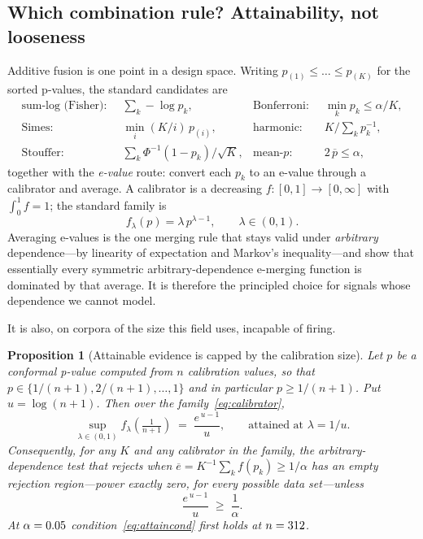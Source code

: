 \documentclass[preprint,12pt,authoryear]{elsarticle}
\newtheorem{proposition}[theorem]{Proposition}
\theoremstyle{definition}
\begin{document}
\subsection{Which combination rule? Attainability, not looseness}
\label{sec:attainability}

Additive fusion is one point in a design space. Writing $p_{(1)} \le \dots \le
p_{(K)}$ for the sorted p-values, the standard candidates are
\begin{align*}
\text{sum-log (Fisher)}:&\;\; \textstyle\sum_k -\log p_k,
&\text{Bonferroni}:&\;\; \min_k p_k \le \alpha/K, \\
\text{Simes}:&\;\; \min_i (K/i)\, p_{(i)},
&\text{harmonic}:&\;\; K / \textstyle\sum_k p_k^{-1}, \\
\text{Stouffer}:&\;\; \textstyle\sum_k \Phi^{-1}(1 - p_k)/\sqrt{K},
&\text{mean-}p:&\;\; 2\,\overline{p} \le \alpha,
\end{align*}
together with the \emph{e-value} route: convert each $p_k$ to an e-value through a
calibrator and average. A calibrator is a decreasing $f:[0,1] \to [0,\infty]$ with
$\int_0^1 f = 1$; the standard family is
\begin{equation}\label{eq:calibrator}
f_\lambda(p) = \lambda\, p^{\lambda - 1}, \qquad \lambda \in (0,1).
\end{equation}
Averaging e-values is the one merging rule that stays valid under
\emph{arbitrary} dependence---by linearity of expectation and Markov's
inequality---and \citet{vovk2021evalues} show that essentially every symmetric
arbitrary-dependence e-merging function is dominated by that average. It is
therefore the principled choice for signals whose dependence we cannot model.

It is also, on corpora of the size this field uses, incapable of firing.

\begin{proposition}[Attainable evidence is capped by the calibration size]
\label{prop:attain}
Let $p$ be a conformal p-value computed from $n$ calibration values, so that
$p \in \{1/(n{+}1), 2/(n{+}1), \dots, 1\}$ and in particular $p \ge 1/(n{+}1)$.
Put $u = \log(n{+}1)$. Then over the family~\eqref{eq:calibrator},
\begin{equation}\label{eq:maxe}
\sup_{\lambda \in (0,1)} f_\lambda\!\left(\tfrac{1}{n+1}\right)
\;=\; \frac{e^{\,u-1}}{u},
\qquad\text{attained at } \lambda = 1/u .
\end{equation}
Consequently, for any $K$ and any calibrator in the family, the
arbitrary-dependence test that rejects when
$\overline{e} = K^{-1}\sum_k f(p_k) \ge 1/\alpha$ has an \emph{empty} rejection
region---power exactly zero, for every possible data set---unless
\begin{equation}\label{eq:attaincond}
\frac{e^{\,u-1}}{u} \;\ge\; \frac{1}{\alpha}.
\end{equation}
At $\alpha = 0.05$ condition~\eqref{eq:attaincond} first holds at
$n = 312$.
\end{proposition}
\end{document}
